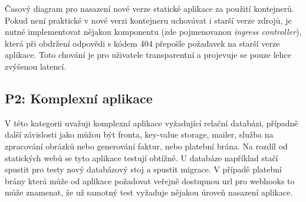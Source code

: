         \begin{iffigure}
            \centering
            \caption{Časový diagram pro nasazení nové verze statické aplikace za použití kontejnerů. Pokud není praktické v nové verzi kontejneru uchovávat i starší verze zdrojů, je nutné implementovat nějakou komponentu (zde pojmenovanou \textit{ingress controller}), která při obdržení odpovědi s  kódem 404 přepošle požadavek na starší verze aplikace. Toto chování je pro uživatele transparentní a projevuje se pouze lehce zvýšenou latencí.}
            \label{fig:static-deploy-container}
        \end{iffigure}

    \subsection{P2: Komplexní aplikace}
        V této kategorii uvažuji komplexní aplikace vyžadující relační databázi, případně další závislosti jako můžou být fronta, key-value storage, mailer, služba na zpracování obrázků nebo generování faktur, nebo platební brána. Na rozdíl od statických webů se tyto aplikace testují obtížně.
        U databáze například stačí spustit pro testy nový databázový stoj a spustit migrace. V případě platební brány která může od aplikace požadovat veřejně dostupnou url pro webhooks to může znamenat, že už samotný test vyžaduje nějakou úroveň nasazení aplikace.

